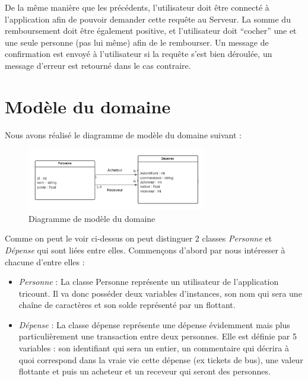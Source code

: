 \documentclass[12,french]{report}
\begin{document}
De la même manière que les précédents, l’utilisateur doit être connecté à l’application afin de pouvoir demander cette requête au Serveur. La somme du remboursement doit être également positive, et l’utilisateur doit “cocher” une et une seule personne (pas lui même) afin de le rembourser. Un message de confirmation est envoyé à l’utilisateur si la requête s’est bien déroulée, un message d’erreur est retourné dans le cas contraire.

\section{Modèle du domaine}

Nous avons réalisé le diagramme de modèle du domaine suivant :\\

\begin{figure}[H]
	\center
	\includegraphics[width=0.7\textwidth]{./Images_pooa/Modele}
	\caption{Diagramme de modèle du domaine}
\end{figure}\vspace{0.2cm}

Comme on peut le voir ci-dessus on peut distinguer 2 classes \textit{Personne} et \textit{Dépense} qui sont liées entre elles. Commençons d’abord par nous intéresser à chacune d’entre elles :\\

\begin{itemize}[label=\textbullet]
	\item \emph{Personne} :
La classe Personne représente un utilisateur de l’application tricount. Il va donc posséder deux variables d’instances, son nom qui sera une chaîne de caractères et son solde représenté par un flottant.
	\item \emph{Dépense} :
La classe dépense représente une dépense évidemment mais plus particulièrement une transaction entre deux personnes. Elle est définie par 5 variables : son identifiant qui sera un entier, un commentaire qui décrira à quoi correspond dans la vraie vie cette dépense (ex tickets de bus), une valeur flottante et puis un acheteur et un receveur qui seront des personnes.
\end{itemize}\vspace{0.5cm}
\end{document}

